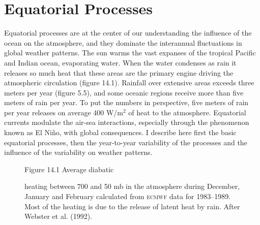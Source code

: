 \chapter{Equatorial Processes}
Equatorial processes are at the center of our understanding the
influence of the ocean on the atmosphere, and they dominate the
interannual fluctuations in global weather patterns. The
sun warms the vast expanses of the
tropical Pacific and Indian ocean, evaporating water. When the water
condenses as rain it releases so much heat that these areas are the
primary engine driving the atmospheric circulation (figure 14.1).
Rainfall over extensive areas
exceeds three meters per year (figure 5.5), and some oceanic regions
receive more than five meters of rain per year. To put the numbers in
perspective, five meters of rain per year releases on average 400
W/m$^2$ of heat to the atmosphere. Equatorial currents modulate the
air-sea interactions, especially through the phenomenon known as El
Ni\~{n}o, with global consequences. I describe here first the basic
equatorial processes, then the year-to-year variability of the
processes and the influence of the variability on weather patterns.

\begin{figure}[b!]
\vspace{-3ex}
\footnotesize
Figure 14.1 Average diabatic \rule{0pt}{3ex}heating between 700 and 50
mb in the atmosphere during December, January and February calculated
from \textsc{ecmwf} data for 1983--1989. Most of the heating is due to
the release of latent heat by rain.  After Webster et al. (1992).
\label{fig:rainheat}
\end{figure}

